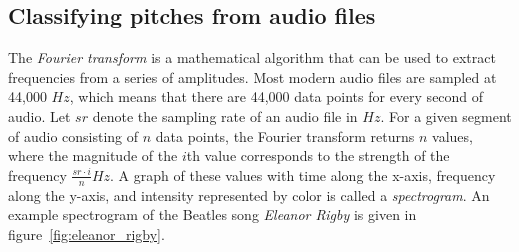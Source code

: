 \subsection{Classifying pitches from audio files}

The \textit{Fourier transform} is a mathematical algorithm that can be used
to extract frequencies from a series of amplitudes. Most modern audio files
are sampled at 44,000 $Hz$, which means that there
are 44,000 data points for every second of audio. Let $sr$ denote the sampling
rate of an audio file in $Hz$. For a given segment of audio consisting of
$n$ data points, the Fourier transform returns $n$ values, where the magnitude
of the $i$th value corresponds to the strength of the frequency $\frac{sr
   \cdot i}{n}Hz$. A graph of these values with time along the x-axis, frequency
along the y-axis, and intensity represented by color is called a \textit{spectrogram}.
An example spectrogram of the Beatles song \textit{Eleanor Rigby} is given
in figure~\ref{fig:eleanor_rigby}.
